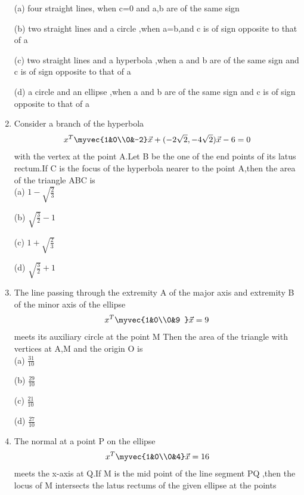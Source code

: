 \begin{enumerate}
      \choice (a) four straight lines, when c=0 and a,b are of the same sign 
      
      \choice (b) two straight lines and a circle ,when a=b,and c is of sign opposite to that of a
      
      \choice (c) two straight lines and a hyperbola ,when a and b are of the same sign and c is of sign opposite to that of a 
      
    \choice (d) a circle and an ellipse ,when a and b are of the same sign and c is of sign opposite to that of a\\
    
    \item Consider a branch  of the hyperbola \begin{align} x^T\myvec{1&0\\0&-2}\vec x+(-2\sqrt{2},-4\sqrt{2})\vec x-6=0\end{align} with the vertex at the point A.Let B be the one of the end points of its latus rectum.If C is the focus of the hyperbola nearer to the point A,then the area of the triangle ABC is\\ 
    
    \choice (a) $1-\sqrt{\frac{2}{3}}$
    
    \choice (b) $\sqrt{\frac{3}{2}}-1$

    \choice (c) $1+\sqrt{\frac{2}{3}}$

    \choice (d) $\sqrt{\frac{3}{2}}+1$\\

\item The line passing through the extremity A of the major axis and extremity B of the minor axis of the ellipse  \begin{align}x^T\myvec{1&0\\0&9 } \vec x =9\end{align}
meets its auxiliary circle at the point M Then the area of the triangle with vertices at A,M and the origin O is\\

\choice (a) $\frac{31}{10}$

\choice (b) $\frac{29}{10}$

\choice (c) $\frac{21}{10}$

\choice (d) $\frac{27}{10}$\\

\item The normal at a point P on the ellipse \begin{align}
 x^T\myvec{1&0\\0&4} \vec x =16\end{align} meets the x-axis at Q.If M is the mid point of the line segment PQ ,then the locus of M intersects the latus rectums of the given ellipse at the points\\  


\end{enumerate}

